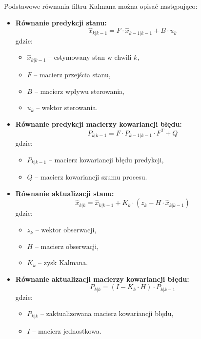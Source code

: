 Podstawowe równania filtru Kalmana można opisać następująco:

\begin{itemize}
    \item \textbf{Równanie predykcji stanu:}
    \begin{equation}
    \hat{x}_{k|k-1} = F \cdot \hat{x}_{k-1|k-1} + B \cdot u_k
    \end{equation}
    gdzie:
    \begin{itemize}
        \item $\hat{x}_{k|k-1}$ – estymowany stan w chwili $k$,
        \item $F$ – macierz przejścia stanu,
        \item $B$ – macierz wpływu sterowania,
        \item $u_k$ – wektor sterowania.
    \end{itemize}
    
    \item \textbf{Równanie predykcji macierzy kowariancji błędu:}
    \begin{equation}
    P_{k|k-1} = F \cdot P_{k-1|k-1} \cdot F^T + Q
    \end{equation}
    gdzie:
    \begin{itemize}
        \item $P_{k|k-1}$ – macierz kowariancji błędu predykcji,
        \item $Q$ – macierz kowariancji szumu procesu.
    \end{itemize}
    
    \item \textbf{Równanie aktualizacji stanu:}
    \begin{equation}
    \hat{x}_{k|k} = \hat{x}_{k|k-1} + K_k \cdot (z_k - H \cdot \hat{x}_{k|k-1})
    \end{equation}
    gdzie:
    \begin{itemize}
        \item $z_k$ – wektor obserwacji,
        \item $H$ – macierz obserwacji,
        \item $K_k$ – zysk Kalmana.
    \end{itemize}
    
    \item \textbf{Równanie aktualizacji macierzy kowariancji błędu:}
    \begin{equation}
    P_{k|k} = (I - K_k \cdot H) \cdot P_{k|k-1}
    \end{equation}
    gdzie:
    \begin{itemize}
        \item $P_{k|k}$ – zaktualizowana macierz kowariancji błędu,
        \item $I$ – macierz jednostkowa.
    \end{itemize}
\end{itemize}

